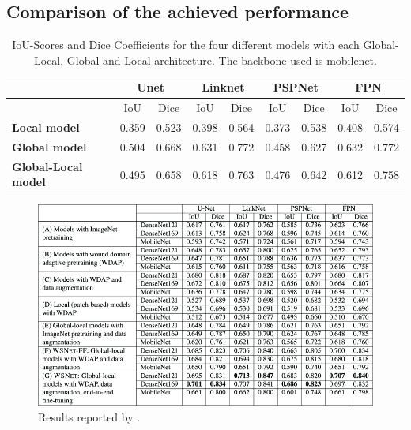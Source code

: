 \subsection{Comparison of the achieved performance}

\begin{table}[htb!]
	\centering
	\begin{tabular}{l||c | c | c | c | c | c | c | c|}
	& \multicolumn{2}{|c|}{Unet} & \multicolumn{2}{|c|}{Linknet} & \multicolumn{2}{|c|}{PSPNet} & \multicolumn{2}{|c|}{FPN} \\
	\hline
	& IoU & Dice & IoU & Dice & IoU & Dice & IoU & Dice \\
	\hline\hline
	\textbf{Local model} & 0.359 & 0.523 & 0.398 & 0.564 & 0.373 & 0.538 & 0.408 & 0.574 \\	
	\textbf{Global model} & 0.504 & 0.668 & 0.631 & 0.772 & 0.458 & 0.627 & 0.632 & 0.772 \\
	\textbf{Global-Local model} & 0.495 & 0.658 & 0.618 & 0.763 & 0.476 & 0.642 & 0.612 & 0.758\\
	\end{tabular}
	\caption{IoU-Scores and Dice Coefficients for the four different models with each Global-Local, Global and Local architecture. The backbone used is mobilenet.}
\end{table}

\begin{figure}[htb!]
	\centering
	\includegraphics[width=\textwidth]{fig/wsnet-results.png}
	\caption{Results reported by \citeauthor{Oota_2023_WACV} \cite{Oota_2023_WACV}.}
\end{figure}

